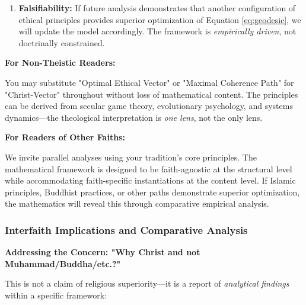 \documentclass[11pt,a4paper]{article}
\theoremstyle{definition}
\theoremstyle{remark}
\begin{document}
\begin{mdframed}[backgroundcolor=blue!5]
\begin{enumerate}
\item \textbf{Falsifiability:} If future analysis demonstrates that another configuration of ethical principles provides superior optimization of Equation \ref{eq:geodesic}, we will update the model accordingly. The framework is \textit{empirically driven}, not doctrinally constrained.
\end{enumerate}

\textbf{For Non-Theistic Readers:}

You may substitute "Optimal Ethical Vector" or "Maximal Coherence Path" for "Christ-Vector" throughout without loss of mathematical content. The principles can be derived from secular game theory, evolutionary psychology, and systems dynamics—the theological interpretation is \textit{one lens}, not the only lens.

\textbf{For Readers of Other Faiths:}

We invite parallel analyses using your tradition's core principles. The mathematical framework is designed to be faith-agnostic at the structural level while accommodating faith-specific instantiations at the content level. If Islamic principles, Buddhist practices, or other paths demonstrate superior optimization, the mathematics will reveal this through comparative empirical analysis.
\end{mdframed}


\subsubsection{Interfaith Implications and Comparative Analysis}

\textbf{Addressing the Concern: "Why Christ and not Muhammad/Buddha/etc.?"}

This is not a claim of religious superiority—it is a report of \textit{analytical findings} within a specific framework:
\end{document}
